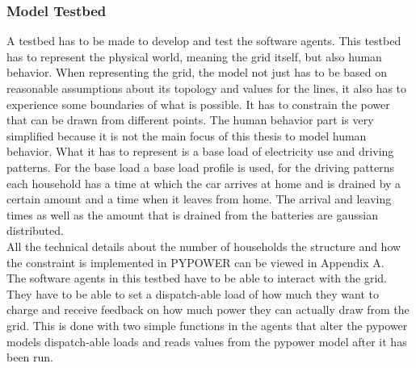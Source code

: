 \documentclass[a4paper]{article}
\begin{document}
\subsubsection{Model Testbed}
A testbed has to be made to develop and test the software agents. This testbed has to represent the physical world,
meaning the 
grid itself, but also human behavior. When representing the grid, the model not just has to be based on reasonable
assumptions 
about its topology and values for the lines, it also has to experience some boundaries of what is possible. 
It has to constrain the power
that can be drawn from different points. 
The human behavior part is very simplified because it is not the main focus of this thesis to model 
human behavior. What it has to 
represent is a base load of electricity use and driving patterns. For the base load a base load profile is used, 
for the driving patterns 
each household has a time at which the car arrives at home and is drained by a certain amount and a time when it 
leaves from home. The 
arrival and leaving times as well as the amount that is drained from the batteries are gaussian distributed.\\
All the technical details about the number of households the structure and how the constraint is 
implemented in PYPOWER can be 
viewed in Appendix A. \\
The software agents in this testbed have to be able to interact with the grid. They have to be able to set a
dispatch-able load of how 
much they want to charge and receive feedback on how much power they can actually draw from the grid. This 
is done with two simple functions 
in the agents that alter the pypower models dispatch-able loads and reads values from the pypower model after
it has been run. 
\end{document}
